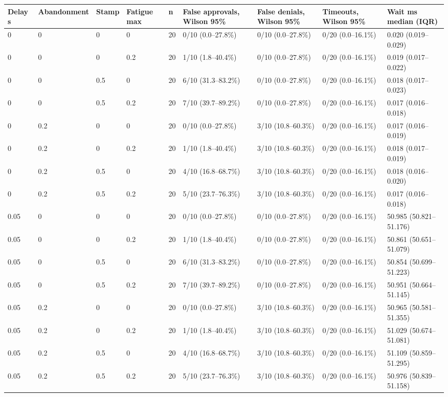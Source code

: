 \begin{tabular}{lllllllll}
\hline
Delay s & Abandonment & Stamp & Fatigue max & n & False approvals, Wilson 95\% & False denials, Wilson 95\% & Timeouts, Wilson 95\% & Wait ms median (IQR) \\
\hline
0 & 0 & 0 & 0 & 20 & 0/10 (0.0--27.8\%) & 0/10 (0.0--27.8\%) & 0/20 (0.0--16.1\%) & 0.020 (0.019--0.029) \\
0 & 0 & 0 & 0.2 & 20 & 1/10 (1.8--40.4\%) & 0/10 (0.0--27.8\%) & 0/20 (0.0--16.1\%) & 0.019 (0.017--0.022) \\
0 & 0 & 0.5 & 0 & 20 & 6/10 (31.3--83.2\%) & 0/10 (0.0--27.8\%) & 0/20 (0.0--16.1\%) & 0.018 (0.017--0.023) \\
0 & 0 & 0.5 & 0.2 & 20 & 7/10 (39.7--89.2\%) & 0/10 (0.0--27.8\%) & 0/20 (0.0--16.1\%) & 0.017 (0.016--0.018) \\
0 & 0.2 & 0 & 0 & 20 & 0/10 (0.0--27.8\%) & 3/10 (10.8--60.3\%) & 0/20 (0.0--16.1\%) & 0.017 (0.016--0.019) \\
0 & 0.2 & 0 & 0.2 & 20 & 1/10 (1.8--40.4\%) & 3/10 (10.8--60.3\%) & 0/20 (0.0--16.1\%) & 0.018 (0.017--0.019) \\
0 & 0.2 & 0.5 & 0 & 20 & 4/10 (16.8--68.7\%) & 3/10 (10.8--60.3\%) & 0/20 (0.0--16.1\%) & 0.018 (0.016--0.020) \\
0 & 0.2 & 0.5 & 0.2 & 20 & 5/10 (23.7--76.3\%) & 3/10 (10.8--60.3\%) & 0/20 (0.0--16.1\%) & 0.017 (0.016--0.018) \\
0.05 & 0 & 0 & 0 & 20 & 0/10 (0.0--27.8\%) & 0/10 (0.0--27.8\%) & 0/20 (0.0--16.1\%) & 50.985 (50.821--51.176) \\
0.05 & 0 & 0 & 0.2 & 20 & 1/10 (1.8--40.4\%) & 0/10 (0.0--27.8\%) & 0/20 (0.0--16.1\%) & 50.861 (50.651--51.079) \\
0.05 & 0 & 0.5 & 0 & 20 & 6/10 (31.3--83.2\%) & 0/10 (0.0--27.8\%) & 0/20 (0.0--16.1\%) & 50.854 (50.699--51.223) \\
0.05 & 0 & 0.5 & 0.2 & 20 & 7/10 (39.7--89.2\%) & 0/10 (0.0--27.8\%) & 0/20 (0.0--16.1\%) & 50.951 (50.664--51.145) \\
0.05 & 0.2 & 0 & 0 & 20 & 0/10 (0.0--27.8\%) & 3/10 (10.8--60.3\%) & 0/20 (0.0--16.1\%) & 50.965 (50.581--51.355) \\
0.05 & 0.2 & 0 & 0.2 & 20 & 1/10 (1.8--40.4\%) & 3/10 (10.8--60.3\%) & 0/20 (0.0--16.1\%) & 51.029 (50.674--51.081) \\
0.05 & 0.2 & 0.5 & 0 & 20 & 4/10 (16.8--68.7\%) & 3/10 (10.8--60.3\%) & 0/20 (0.0--16.1\%) & 51.109 (50.859--51.295) \\
0.05 & 0.2 & 0.5 & 0.2 & 20 & 5/10 (23.7--76.3\%) & 3/10 (10.8--60.3\%) & 0/20 (0.0--16.1\%) & 50.976 (50.839--51.158) \\

\end{tabular}
